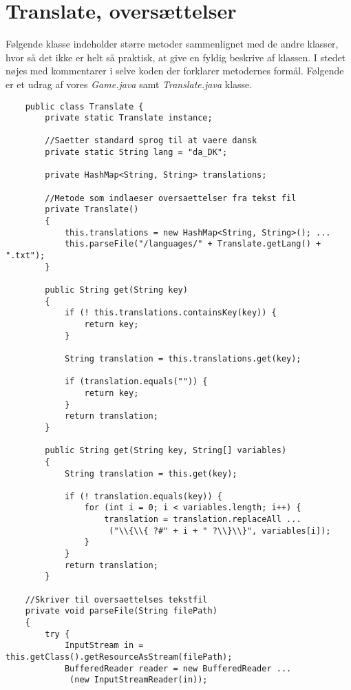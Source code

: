 \section{Translate, oversættelser}
\noindent Følgende klasse indeholder større metoder sammenlignet med de andre klasser, hvor så det ikke er helt så praktisk, at give en fyldig beskrive af klassen.
I stedet nøjes med kommentarer i selve koden der forklarer metodernes formål.
Følgende er et udrag af vores \textit{Game.java} samt \textit{Translate.java} klasse.
\begin{lstlisting}
    public class Translate {
        private static Translate instance;
        
        //Saetter standard sprog til at vaere dansk
        private static String lang = "da_DK";
        
        private HashMap<String, String> translations;

        //Metode som indlaeser oversaettelser fra tekst fil
        private Translate()
        {
            this.translations = new HashMap<String, String>(); ...
            this.parseFile("/languages/" + Translate.getLang() + ".txt");
        }

        public String get(String key)
        {
            if (! this.translations.containsKey(key)) {
                return key;
            }
    
            String translation = this.translations.get(key);
    
            if (translation.equals("")) {
                return key;
            }
            return translation;
        }
    
        public String get(String key, String[] variables)
        {
            String translation = this.get(key);
    
            if (! translation.equals(key)) {
                for (int i = 0; i < variables.length; i++) {
                    translation = translation.replaceAll ...
                     ("\\{\\{ ?#" + i + " ?\\}\\}", variables[i]);
                }
            }
            return translation;
        }
    
    //Skriver til oversaettelses tekstfil
    private void parseFile(String filePath)
    {
        try {
            InputStream in = this.getClass().getResourceAsStream(filePath);
            BufferedReader reader = new BufferedReader ...
             (new InputStreamReader(in));


\end{lstlisting}
